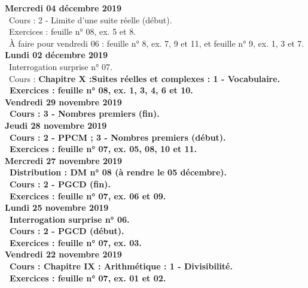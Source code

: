\documentclass[12pt,a4paper]{article}
\begin{document}
\noindent\textbf{Mercredi 04 décembre 2019}\\
\bu\ Cours : 2 - Limite d'une suite réelle (début).\\
\bu\ Exercices : feuille n° 08, ex. 5 et 8.\\
\bu\ À faire pour vendredi 06 : feuille n° 8, ex. 7, 9 et 11, et feuille n° 9, ex. 1, 3 et 7.\vspace{.4cm}\\

\noindent\textbf{Lundi 02 décembre 2019}\\
\bu\ Interrogation surprise n° 07.\\
\bu\ Cours : \bf Chapitre X :\rm Suites réelles et complexes : 1 - Vocabulaire.
\\
\bu\ Exercices : feuille n° 08, ex. 1, 3, 4, 6 et 10.\vspace{.4cm}\\

\noindent\textbf{Vendredi 29 novembre 2019}\\
\bu\ Cours : 3 - Nombres premiers (fin).\vspace{.4cm}\\


\noindent\textbf{Jeudi 28 novembre 2019}\\
\bu\ Cours : 2 - PPCM ; 3 - Nombres premiers (début).\\
\bu\ Exercices : feuille n° 07, ex. 05, 08, 10 et 11.\vspace{.4cm}\\
  
\noindent\textbf{\bf Mercredi 27 novembre 2019}\\
\bu\ Distribution : DM n° 08 (à rendre le 05 décembre).\\
\bu\ Cours : 2 - PGCD (fin).\\
\bu\ Exercices : feuille n° 07, ex. 06 et 09.\vspace{.4cm}\\

\noindent\textbf{Lundi 25 novembre 2019}\\
\bu\ Interrogation surprise n° 06.\\
\bu\ Cours : 2 - PGCD (début).\\
\bu\ Exercices : feuille n° 07, ex. 03.\vspace{.4cm}\\ 

\noindent\textbf{Vendredi 22 novembre 2019}\\
\bu\ Cours : \bf Chapitre IX \rm : Arithmétique : 1 - Divisibilité.\\
\bu\ Exercices : feuille n° 07, ex. 01 et 02.\vspace{.4cm}\\ 
\end{document}
